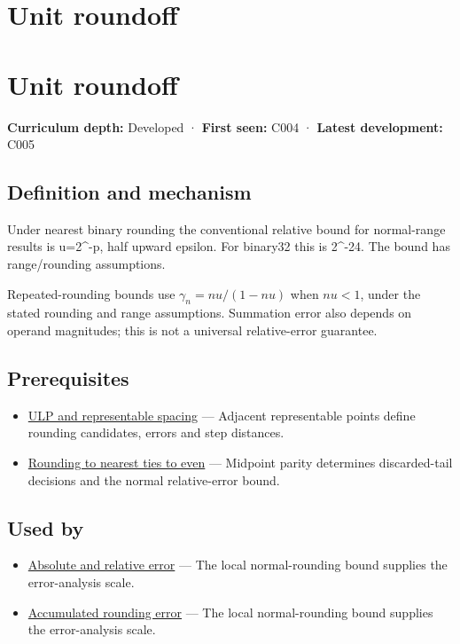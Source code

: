 \hypertarget{appendix-bc44f7b42f42}{}
\section*{Unit roundoff}
\section{Unit roundoff}\label{unit-roundoff}

\textbf{Curriculum depth:} Developed · \textbf{First seen:} C004 · \textbf{Latest development:} C005

\subsection{Definition and mechanism}\label{definition-and-mechanism}

Under nearest binary rounding the conventional relative bound for normal-range results is u=2\^{}-p, half upward epsilon. For binary32 this is 2\^{}-24. The bound has range/rounding assumptions.

Repeated-rounding bounds use \(\gamma_n=nu/(1-nu)\) when \(nu<1\), under the stated rounding and range assumptions. Summation error also depends on operand magnitudes; this is not a universal relative-error guarantee.

\subsection{Prerequisites}\label{prerequisites}

\begin{itemize}
\tightlist
\item
  \hyperref[appendix-14bab4cab9d4]{ULP and representable spacing} --- Adjacent representable points define rounding candidates, errors and step distances.
\item
  \hyperref[appendix-614afe1de592]{Rounding to nearest ties to even} --- Midpoint parity determines discarded-tail decisions and the normal relative-error bound.
\end{itemize}

\subsection{Used by}\label{used-by}

\begin{itemize}
\tightlist
\item
  \hyperref[appendix-3ae74e89b4e6]{Absolute and relative error} --- The local normal-rounding bound supplies the error-analysis scale.
\item
  \hyperref[appendix-f82e270791c8]{Accumulated rounding error} --- The local normal-rounding bound supplies the error-analysis scale.
\end{itemize}


